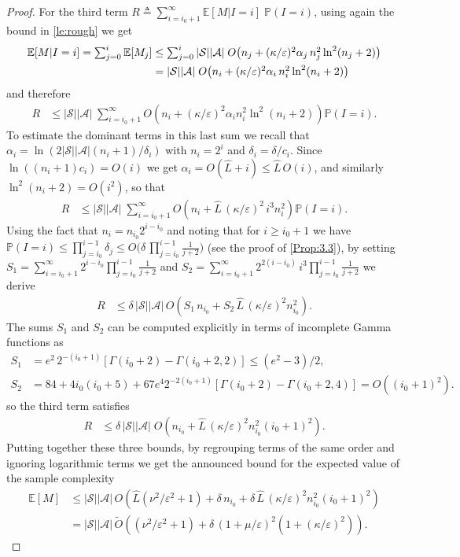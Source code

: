 \documentclass{article}
\newcommand{\cA}{\mathcal{A}}
\newcommand{\cS}{\mathcal{S}}
\newcommand{\expec}{\mathbb{E}}
\newcommand{\prob}{\mathbb{P}}
\theoremstyle{plain}
\theoremstyle{definition}
\theoremstyle{remark}
\begin{document}
\begin{proof}
For the third term $R\triangleq \sum_{i=i_0+1}^\infty \expec[M|I=i]\; \prob( I=i)$, using again the bound in \cref{le:rough} we get
\begin{align*}
\mbox{$\expec[M|I=i]=\sum_{j=0}^i \expec[M_j]$}&\leq\mbox{$\sum_{j=0}^i
|\cS||\cA|\;O\!\left (n_j+(\kappa/\varepsilon)^2\alpha_j\, n_j^2 \ln^2(n_j+2) \right )$}\\
&=\mbox{$
|\cS||\cA|\;O\!\left (n_i+(\kappa/\varepsilon)^2\alpha_i\, n_i^2 \ln^2(n_i+2) \right )$}
\end{align*}
and therefore
\begin{align*}
R&\leq |\cS||\cA|\;\mbox{$\sum_{i=i_0+1}^\infty O\!\left (n_i+(\kappa/\varepsilon)^2\alpha_i n_i^2 \ln^2(n_i+2) \right )\prob( I=i)$}.
\end{align*}
To estimate the dominant terms in this last sum we recall that $\alpha_i=\ln(2|\cS||\cA|(n_i+1)/\delta_i)$ with $n_i=2^i$ and $\delta_i=\delta/c_i$. Since $\ln((n_i+1)c_i)=O(i)$ we get $\alpha_i=O(\widehat{L}+i)\leq \widehat{L}\,O(i)$, and similarly $\ln^2(n_i+2)=O(i^2)$, so that 
\begin{align*}
R
&\leq |\cS||\cA|\;
\mbox{$\sum_{i=i_0+1}^\infty O\!\left (n_i+\widehat{L}\,(\kappa/\varepsilon)^2\,i^3 n_i^2\right )\prob( I=i)$}.
\end{align*}
Using the fact that $n_i=n_{i_0}2^{i-i_0}$ 
 and noting  that for $i\geq i_0+1$ we have $\prob (I =i) \le  \prod^{i-1}_{j=i_0} \delta_j\leq O\big(\delta\,\prod_{j=i_0}^{i-1}\frac{1}{j+2}\big)$
 (see the proof of 
\cref{Prop:3.3}), by setting $S_1=\sum_{i=i_0+1}^\infty 2^{i-i_0}\prod^{i-1}_{j=i_0} \frac{1}{j+2}$ and $S_2=\sum_{i=i_0+1}^\infty 2^{2(i-i_0)}\,i^3  \prod^{i-1}_{j=i_0} \frac{1}{j+2}$ we  derive
\begin{align*}
R&\leq \delta\,|\cS||\cA|\,\mbox{$O\!\left (S_1\, n_{i_0}+S_2\,\widehat{L}\,(\kappa/\varepsilon)^2n_{i_0}^2\right)$}.
\end{align*}
The sums $S_1$ and $S_2$ can be computed explicitly in terms of incomplete Gamma functions as 
\begin{align*}
S_1&=e^2\,2^{-(i_0+1)}[\Gamma(i_0+2)-\Gamma(i_0+2,2)]\leq (e^2-3)/2,\\
S_2&=84+4i_0 (i_0+5)+67 e^4 2^{-2(i_0+1)} [\Gamma (i_0+2)-\Gamma (i_0+2,4)]=O((i_0\!+\!1)^2).
\end{align*}
so the third term satisfies
\begin{align*}
R&\leq \delta\,|\cS||\cA|\;\mbox{$O\!\left (n_{i_0}+\widehat{L}\,(\kappa/\varepsilon)^2n_{i_0}^2 (i_0\!+\!1)^2\right)$}.
\end{align*}
Putting together these three bounds, by regrouping terms of the same order 
and ignoring logarithmic terms we get the announced bound for the expected value of the sample complexity 
\begin{align*}
    \expec[M]&\le |\cS||\cA|\,O\left(\mbox{$\widehat{L}(\nu^{2}/{\varepsilon^{2}}+1) +
    \delta\,n_{i_0}+\delta\,\widehat{L}\,(\kappa/\varepsilon)^2 n_{i_{0}}^2(i_0+1)^2$}\right)\\
    &= |\cS||\cA|\,\widetilde{O}\left(\mbox{$(\nu^{2}/{\varepsilon^{2}}+1) +
    \delta\, (1+\mu/\varepsilon)^2(1+(\kappa/\varepsilon)^2)$}\right).
\end{align*}  


\end{proof}
\end{document}
